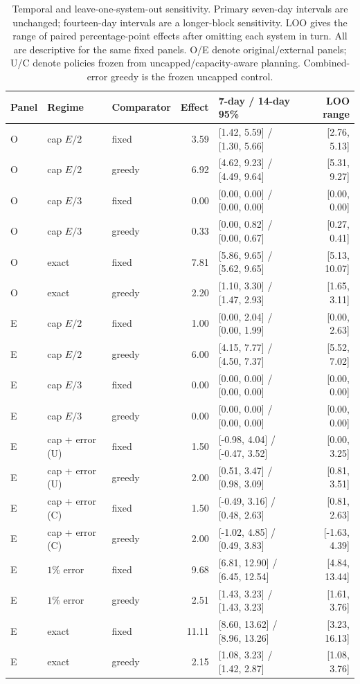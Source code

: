 \begin{table}[htbp]
\centering\scriptsize
\begin{tabular}{lllrlr}
\toprule
Panel & Regime & Comparator & Effect & 7-day / 14-day 95\% & LOO range\\
\midrule
O & cap $E/2$ & fixed & 3.59 & [1.42, 5.59] / [1.30, 5.66] & [2.76, 5.13]\\
O & cap $E/2$ & greedy & 6.92 & [4.62, 9.23] / [4.49, 9.64] & [5.31, 9.27]\\
O & cap $E/3$ & fixed & 0.00 & [0.00, 0.00] / [0.00, 0.00] & [0.00, 0.00]\\
O & cap $E/3$ & greedy & 0.33 & [0.00, 0.82] / [0.00, 0.67] & [0.27, 0.41]\\
O & exact & fixed & 7.81 & [5.86, 9.65] / [5.62, 9.65] & [5.13, 10.07]\\
O & exact & greedy & 2.20 & [1.10, 3.30] / [1.47, 2.93] & [1.65, 3.11]\\
E & cap $E/2$ & fixed & 1.00 & [0.00, 2.04] / [0.00, 1.99] & [0.00, 2.63]\\
E & cap $E/2$ & greedy & 6.00 & [4.15, 7.77] / [4.50, 7.37] & [5.52, 7.02]\\
E & cap $E/3$ & fixed & 0.00 & [0.00, 0.00] / [0.00, 0.00] & [0.00, 0.00]\\
E & cap $E/3$ & greedy & 0.00 & [0.00, 0.00] / [0.00, 0.00] & [0.00, 0.00]\\
E & cap + error (U) & fixed & 1.50 & [-0.98, 4.04] / [-0.47, 3.52] & [0.00, 3.25]\\
E & cap + error (U) & greedy & 2.00 & [0.51, 3.47] / [0.98, 3.09] & [0.81, 3.51]\\
E & cap + error (C) & fixed & 1.50 & [-0.49, 3.16] / [0.48, 2.63] & [0.81, 2.63]\\
E & cap + error (C) & greedy & 2.00 & [-1.02, 4.85] / [0.49, 3.83] & [-1.63, 4.39]\\
E & $1\%$ error & fixed & 9.68 & [6.81, 12.90] / [6.45, 12.54] & [4.84, 13.44]\\
E & $1\%$ error & greedy & 2.51 & [1.43, 3.23] / [1.43, 3.23] & [1.61, 3.76]\\
E & exact & fixed & 11.11 & [8.60, 13.62] / [8.96, 13.26] & [3.23, 16.13]\\
E & exact & greedy & 2.15 & [1.08, 3.23] / [1.42, 2.87] & [1.08, 3.76]\\
\bottomrule
\end{tabular}
\caption{Temporal and leave-one-system-out sensitivity. Primary seven-day intervals are unchanged; fourteen-day intervals are a longer-block sensitivity. LOO gives the range of paired percentage-point effects after omitting each system in turn. All are descriptive for the same fixed panels. O/E denote original/external panels; U/C denote policies frozen from uncapped/capacity-aware planning. Combined-error greedy is the frozen uncapped control.}
\label{tab:joint_long_dependence}
\end{table}
